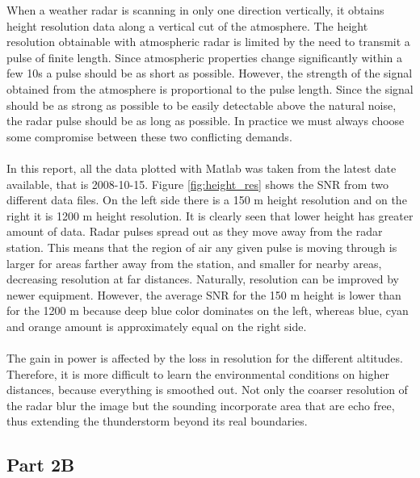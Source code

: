 \documentclass{article}
\begin{document}
When a weather radar is scanning in only one direction vertically, it obtains height resolution data along a vertical cut of the atmosphere. \cite{Wiki:2012wr} The height resolution obtainable with atmospheric radar is limited by the need to transmit a pulse of finite length. Since atmospheric properties change significantly within a few 10s a pulse should be as short as possible. However, the strength of the signal obtained from the atmosphere is proportional to the pulse length. Since the signal should be as strong as possible to be easily detectable above the natural noise, the radar pulse should be as long as possible. In practice we must always choose some compromise between these two conflicting demands. \cite{Enmark:2012a2}\\
\\
In this report, all the data plotted with Matlab was taken from the latest date available, that is 2008-10-15. Figure \ref{fig:height_res} shows the SNR from two different data files. On the left side there is a 150 m height resolution and on the right it is 1200 m height resolution. It is clearly seen that lower height has greater amount of data. Radar pulses spread out as they move away from the radar station. This means that the region of air any given pulse is moving through is larger for areas farther away from the station, and smaller for nearby areas, decreasing resolution at far distances. Naturally, resolution can be improved by newer equipment. \cite{Wiki:2012wr} However, the average SNR for the 150 m height is lower than for the 1200 m because deep blue color dominates on the left, whereas blue, cyan and orange amount is approximately equal on the right side.\\
\\
The gain in power is affected by the loss in resolution for the different altitudes. Therefore, it is more difficult to learn the environmental conditions on higher distances, because everything is smoothed out. Not only the coarser resolution of the radar blur the image but the sounding incorporate area that are echo free, thus extending the thunderstorm beyond its real boundaries. \cite{Wiki:2012wr}



\subsection{Part 2B}
\end{document}
